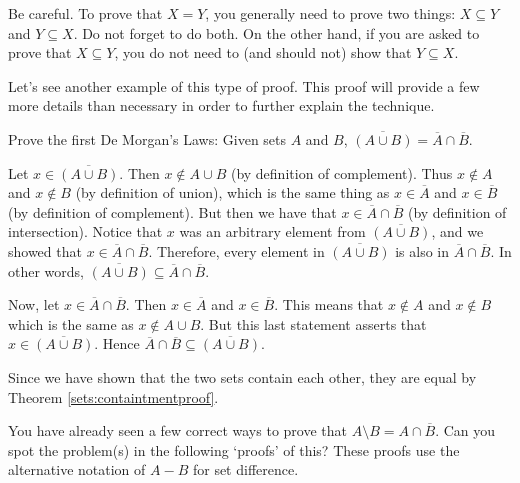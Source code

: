 \begin{rem}
Be careful.  To prove that $X=Y$, you generally need to prove two things: $X\subseteq Y$ and
$Y\subseteq X$.  Do not forget to do both.  On the other hand, if you are asked to prove that
$X\subseteq Y$, you do not need to (and should not) show that $Y\subseteq X$.
\end{rem}

Let's see another example of this type of proof.  This proof will provide a few more details
than necessary in order to further explain the technique.

\begin{exa}
Prove the first De Morgan's Laws: Given sets $A$ and $B$, 
$\overline{(A\cup B)} = \overline{A}\cap \overline{B}$.
\begin{pf}
Let $x \in \overline{(A\cup B)}$. 
Then $x \not\in A \cup B$ (by definition of complement).
Thus $x \not\in A$ and $x \not\in B$ (by definition of union), which is the same thing as 
$x \in \overline{A}$ and $x \in \overline{B}$ (by definition of complement).
But then we have that $x \in \overline{A} \cap \overline{B}$ (by definition of intersection). 
Notice that $x$ was an arbitrary element from $\overline{(A\cup B)}$, 
and we showed that $x\in \overline{A} \cap \overline{B}$.  Therefore, every element
in $\overline{(A\cup B)}$ is also in $\overline{A} \cap \overline{B}$.  In other words,
$\overline{(A \cup B)} \subseteq \overline{A} \cap \overline{B}.$

Now, let $x \in \overline{A} \cap \overline{ B}.$ Then $x\in \overline{A}$ and
$x\in {\overline B}$. This means that $x \not\in A$ and $x \not\in B$
which is the same as $x \not\in A \cup B.$ But this last statement
asserts that $x \in \overline{(A \cup B)}$. Hence $\overline{A} \cap \overline{B}
\subseteq \overline{(A \cup B)}.$

Since we have shown that the two sets contain each other, they are equal by 
Theorem \ref{sets:containtmentproof}.
\end{pf}
\end{exa}


You have already seen a few correct ways to prove that $A\setminus B = A\cap\overline{B}$.  
Can you spot the problem(s) in the following `proofs' of this?
These proofs use the alternative notation of $A-B$ for set difference.

